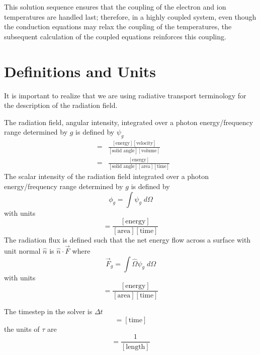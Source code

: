 \documentclass{article}
\newcommand{\units}[1]{\ensuremath{[\mbox{#1}]}}
\begin{document}
This solution sequence ensures that the coupling of the electron and ion
temperatures are handled last; therefore, in a highly coupled system,
even though the conduction equations may relax the coupling of the temperatures,
the subsequent calculation of the coupled equations reinforces this coupling.


\appendix

\section{Definitions and Units}

It is important to realize that we are using radiative transport terminology
for the description of the radiation field.

The radiation field, angular intensity, integrated over 
a photon energy/frequency range determined by $g$ is defined by $\psi_{g}$
\begin{eqnarray}
     [\psi_{g}] &=& \frac{\units{energy} \units{velocity}}
                         {\units{solid angle} \units{volume}} \\
                &=& \frac{\units{energy}}
                         {\units{solid angle} \units{area} \units{time}}
\end{eqnarray}
The scalar intensity of the radiation field integrated over 
a photon energy/frequency range determined by $g$ is defined by
\begin{equation}
        \phi_{g} = \int \psi_{g} \; d\Omega
\end{equation}
with units
\begin{equation}
        [\phi_{g}] = \frac{\units{energy}}
                          {\units{area} \units{time}}
\end{equation}
The radiation flux is defined such that the net energy flow across
a surface with unit normal $\hat{n}$ is $\hat{n} \cdot \vec{F}$
where
\begin{equation}
        \vec{F}_{g} = \int \hat{\Omega} \psi_{g} \; d\Omega
\end{equation}
with units
\begin{equation}
        [\vec{F}_{g}] = \frac{\units{energy}}
                         {\units{area}\units{time}}
\end{equation}

The timestep in the solver is $\Delta t$
\begin{equation}
        [\Delta t] = \units{time}
\end{equation}
the units of $\tau$ are
\begin{equation}
        [\tau] = \frac{1}{\units{length}}
\end{equation}
\end{document}
